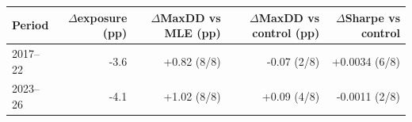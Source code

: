 \begin{tabular}{lrrrr}\toprule
Period & $\Delta$exposure (pp) & $\Delta$MaxDD vs MLE (pp) & $\Delta$MaxDD vs control (pp) & $\Delta$Sharpe vs control\\\midrule
2017--22 & -3.6 & +0.82 (8/8) & -0.07 (2/8) & +0.0034 (6/8) \\
2023--26 & -4.1 & +1.02 (8/8) & +0.09 (4/8) & -0.0011 (2/8) \\
\bottomrule\end{tabular}
